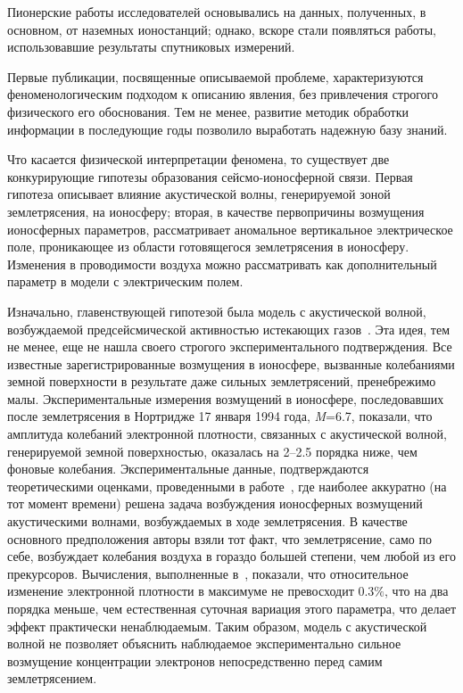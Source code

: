 \documentclass[12pt, oneside, a4paper]{article}
\begin{document}
Пионерские работы исследователей основывались на данных, полученных, в основном, от наземных ионостанций; однако, вскоре стали появляться работы, использовавшие результаты спутниковых измерений. 

Первые публикации, посвященные описываемой проблеме, характеризуются феноменологическим подходом к описанию явления, без привлечения строгого физического его обоснования. Тем не менее, развитие методик обработки информации в последующие годы позволило выработать надежную базу знаний.

Что касается физической интерпретации феномена, то существует две конкурирующие гипотезы образования сейсмо-ионосферной связи. Первая гипотеза описывает влияние акустической волны, генерируемой зоной землетрясения, на ионосферу; вторая, в качестве первопричины возмущения ионосферных параметров, рассматривает аномальное вертикальное электрическое поле, проникающее из области готовящегося землетрясения в ионосферу.  Изменения в проводимости воздуха можно рассматривать как дополнительный параметр в модели с электрическим полем. 

Изначально, главенствующей гипотезой была модель с акустической волной, возбуждаемой предсейсмической активностью истекающих газов~\cite{Hegai:1997}. Эта идея, тем не менее, еще не нашла своего строгого экспериментального подтверждения. Все известные зарегистрированные возмущения в ионосфере, вызванные колебаниями земной поверхности в результате даже сильных землетрясений, пренебрежимо малы.  Экспериментальные измерения возмущений в ионосфере, последовавших после землетрясения в Нортридже 17 января 1994 года, \emph{M}=6.7, показали, что амплитуда колебаний электронной плотности, связанных с акустической волной, генерируемой земной поверхностью, оказалась на 2--2.5 порядка ниже, чем фоновые колебания. Экспериментальные данные, подтверждаются теоретическими оценками, проведенными в работе~\cite{Davies_Archambeau:1998}, где наиболее аккуратно (на тот момент времени) решена задача возбуждения ионосферных возмущений акустическими волнами, возбуждаемых в ходе землетрясения. В качестве основного предположения авторы взяли тот факт, что землетрясение, само по себе, возбуждает колебания воздуха в гораздо большей степени, чем любой из его прекурсоров. Вычисления, выполненные в~\cite{Davies_Archambeau:1998}, показали, что относительное изменение электронной плотности в максимуме не превосходит $0.3\%$, что на два порядка меньше, чем естественная суточная вариация этого параметра, что делает эффект практически ненаблюдаемым. Таким образом, модель с акустической волной не позволяет объяснить наблюдаемое экспериментально сильное возмущение концентрации электронов непосредственно перед самим землетрясением. 
\end{document}
